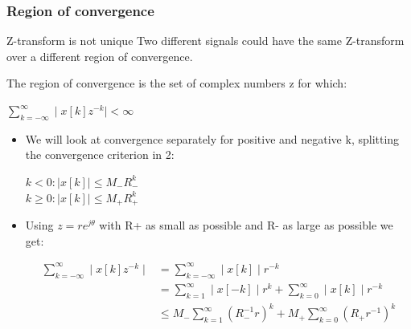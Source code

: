 \begin{frame}
	\frametitle{Region of convergence}
	\begin{alertblock}{Z-transform is not unique}
		Two different signals could have the same Z-transform over a different region of convergence.
	\end{alertblock}
	\begin{definition}
		The region of convergence is the set of complex numbers z for which:
		\vspace{-2em}
		\begin{center}
			$\sum\limits_{k=-\infty}^{\infty} \mid x[k]z^{-k} \mid < \infty$
		\end{center}
		
	\end{definition}
	
	
\end{frame}
\begin{frame}
		\begin{itemize}
			\item We will look at convergence separately for positive and negative k, splitting the convergence criterion in 2:
			\begin{center}
				$k<0: \mid x[k] \mid \leq M_{-}R_{-}^{k}$\\
				$k\geq 0: \mid x[k] \mid \leq M_{+}R_{+}^{k} $
			\end{center}
			\item Using $z = r e^{j\theta}$ with R+ as small as possible and R- as large as possible we get:
			\vspace{-2em}
			\begin{center}
				\begin{align*}
				\sum\limits_{k=-\infty}^{\infty} \mid x[k]z^{-k} \mid &= \sum\limits_{k=-\infty}^{\infty} \mid x[k] \mid r^{-k} \\
				&= \sum\limits_{k=1}^{\infty} \mid x[-k] \mid r^{k} + \sum\limits_{k=0}^{\infty} \mid x[k] \mid r^{-k} \\
				&\leq M_{-} \sum\limits_{k=1}^{\infty} (R_{-}^{-1}r)^{k} + M_{+} \sum\limits_{k= 0}^{\infty}(R_{+}r^{-1})^{k}
				\end{align*}
			\end{center}
		\end{itemize}
\end{frame}
